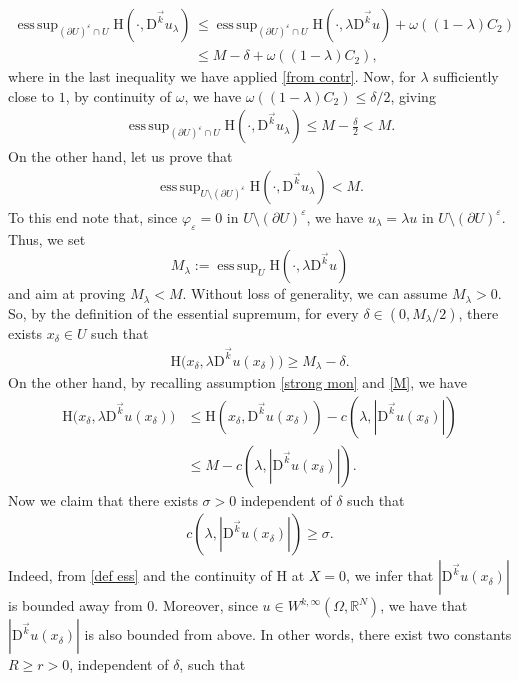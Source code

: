 \documentclass[a4paper,11pt]{article}
\numberwithin{equation}{section}
\newcommand{\numberset}{\mathbb}
\newcommand{\eps}{\varepsilon}
\newcommand{\Om}{\Omega}
\newcommand{\R}{\numberset{R}}
\newcommand{\rom}{\mathrm}
\DeclareMathOperator*{\esssup}{ess\,sup}
\theoremstyle{definition}
\begin{document}
\begin{align*}
\esssup_{(\partial U)^\eps\cap U}\rom{H}(\cdot, \mathrm D^{\vec{k}}u_\lambda)&\leq\esssup_{(\partial U)^\eps\cap U}\rom{H}(\cdot, \lambda\mathrm D^{\vec{k}}u)+ \omega\left((1-\lambda)C_2\right)\\
&\leq M-\delta +\omega\left((1-\lambda)C_2\right),
\end{align*}
where in the last inequality we have applied \eqref{from contr}. Now, for $\lambda$ sufficiently close to $1$, by continuity of $\omega$, we have $\omega\left((1-\lambda)C_2\right)\leq\delta/2$, giving
\begin{align}\label{first key}
\esssup_{(\partial U)^\eps\cap U}\rom{H}(\cdot, \mathrm D^{\vec{k}}u_\lambda)\leq M-\frac{\delta}{2}<M.
\end{align}
On the other hand, let us prove that
\begin{align}\label{second key}
\esssup_{U\setminus (\partial U)^\eps}\rom{H}(\cdot, \mathrm D^{\vec{k}}u_\lambda)<M.
\end{align}
To this end note that, since $\varphi_\eps=0$ in $U\setminus (\partial U)^\eps$, we have $u_\lambda=\lambda u$ in $U\setminus (\partial U)^\eps$. Thus, we set 
$$
M_\lambda:=\esssup_U \rom{H}(\cdot, \lambda \mathrm D^{\vec{k}}u)
$$ 
and aim at proving $M_\lambda<M$. Without loss of generality, we can assume $M_\lambda>0$. So, by the definition of the essential supremum, for every $\delta\in (0,M_\lambda/2)$, there exists $x_\delta\in U$ such that
\begin{align}\label{def ess}
 \rom{H}\big(x_\delta,\lambda \mathrm{D}^{\vec{k}}u(x_\delta)\big)\geq M_\lambda-\delta.
\end{align}
On the other hand, by recalling assumption \eqref{strong mon} and \eqref{M}, we have
\begin{align}
 \rom{H}\big(x_\delta,\lambda \mathrm{D}^{\vec{k}}u(x_\delta)\big)
 &\leq \rom{H}(x_\delta, \mathrm{D}^{\vec{k}}u(x_\delta))-c(\lambda, |\mathrm D^{\vec{k}}u(x_\delta)|)\nonumber\\
&\leq M-c(\lambda, |\mathrm D^{\vec{k}}u(x_\delta)|).\label{from strong}
\end{align}
Now we claim that there exists $\sigma>0$ independent of $\delta$ such that
\begin{align}\label{c}
c(\lambda,|\mathrm D^{\vec{k}}u(x_\delta)|)\geq\sigma.
\end{align}
Indeed, from \eqref{def ess} and the continuity of $\rom{H}$ at $X=0$, we infer that $|\mathrm D^{\vec{k}}u(x_\delta)|$ is bounded away from $0$. Moreover, since $u\in W^{k,\infty}(\Om,\R^N)$, we have that $|\mathrm D^{\vec{k}}u(x_\delta)|$ is also bounded from above. In other words, there exist two constants $R\geq r>0$, independent of $\delta$, such that
\end{document}
